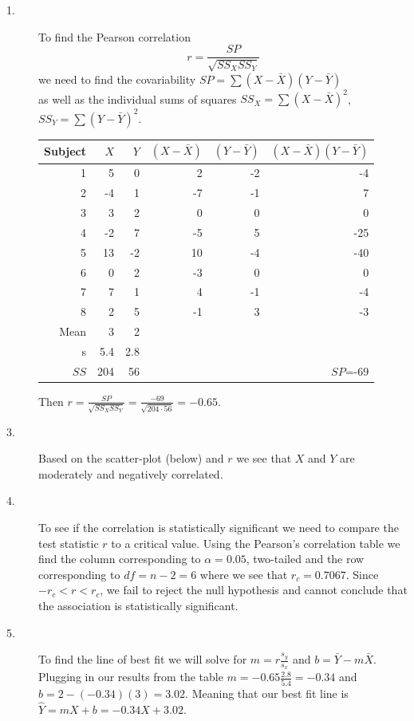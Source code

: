 \documentclass{tufte-handout}
\begin{document}
\begin{fullwidth}

\begin{description}
\item[1.] To find the Pearson correlation
\begin{equation*}
r=\frac{SP}{\sqrt{SS_X SS_Y}}
\end{equation*}
 we need to find the covariability $SP=\sum (X-\bar{X})(Y-\bar{Y})$\\ as well as the individual sums of squares $SS_X=\sum (X-\bar{X})^2$, $SS_Y=\sum (Y-\bar{Y})^2$.

\begin{table}
  \centering
  \selectfont
  \begin{tabular}{rrrrrr}
    \toprule
Subject & $X$ & $Y$ & $(X-\bar{X})$ & $(Y-\bar{Y})$ & $(X-\bar{X})(Y-\bar{Y})$\\
    \midrule
1&     5&     0 &    2 &   -2&    -4\\
2&    -4&     1 &   -7&    -1&     7\\
3&     3&     2 &    0 &    0&     0\\
4&    -2&     7 &   -5&     5&   -25\\
5&    13&    -2&    10&    -4&   -40\\
6&     0 &    2 &   -3 &    0&     0\\
7&     7 &    1 &    4 &   -1&    -4\\
8&     2 &    5 &   -1 &    3&    -3\\
    \bottomrule
Mean& 3 & 2&&&\\
s& 5.4& 2.8 &&&\\
$SS$& 204& 56&&&$SP$=-69\\
    \bottomrule
  \end{tabular}
  \label{tab:normaltab}
\end{table}
\vspace{20pt}

Then $r=\frac{SP}{\sqrt{SS_X SS_Y}}=\frac{-69}{\sqrt{204 \cdot 56}}=-0.65$.

\item[3.] Based on the scatter-plot (below) and $r$ we see that $X$ and $Y$ are moderately and negatively correlated.
\item[4.] To see if the correlation is statistically significant we need to compare the test statistic $r$ to a critical value. Using the Pearson's correlation table we find the column corresponding to $\alpha=0.05$, two-tailed and the row corresponding to $df=n-2=6$ where we see that $r_c=0.7067$. Since $-r_c<r<r_c$, we fail to reject the null hypothesis and cannot conclude that the association is statistically significant.
\item[5.] To find the line of best fit we will solve for $m=r\frac{s_y}{s_x}$ and $b=\bar{Y}-m\bar{X}$. Plugging in our results from the table $m=-0.65\frac{2.8}{5.4}=-0.34$ and $b=2-(-0.34)(3)=3.02$. Meaning that our best fit line is $\hat{Y}=mX+b=-0.34X+3.02.$


\end{description}
\end{fullwidth}
\end{document}
